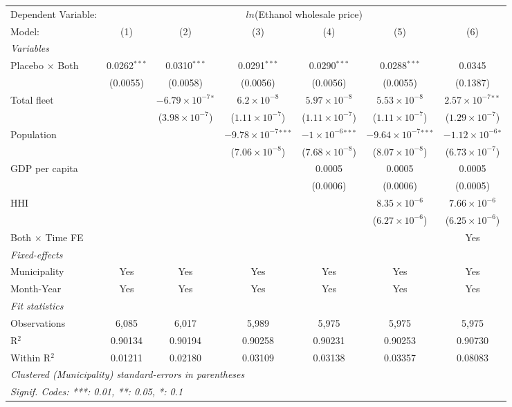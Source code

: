 \documentclass[
]{article}
\begin{document}
\begin{tabular}{lcccccc}
\tabularnewline\midrule\midrule
Dependent Variable:&\multicolumn{6}{c}{$ln$(Ethanol wholesale price)}\\
Model:&(1) & (2) & (3) & (4) & (5) & (6)\\
\midrule \emph{Variables}&   &   &   &   &   &  \\
Placebo $\times $ Both & 0.0262$^{***}$ & 0.0310$^{***}$ & 0.0291$^{***}$ & 0.0290$^{***}$ & 0.0288$^{***}$ & 0.0345\\
  &(0.0055) & (0.0058) & (0.0056) & (0.0056) & (0.0055) & (0.1387)\\
Total fleet &    & $-6.79\times 10^{-7}$$^{*}$ & $6.2\times 10^{-8}$ & $5.97\times 10^{-8}$ & $5.53\times 10^{-8}$ & $2.57\times 10^{-7}$$^{**}$\\
  &   & ($3.98\times 10^{-7}$) & ($1.11\times 10^{-7}$) & ($1.11\times 10^{-7}$) & ($1.11\times 10^{-7}$) & ($1.29\times 10^{-7}$)\\
Population &    &    & $-9.78\times 10^{-7}$$^{***}$ & $-1\times 10^{-6}$$^{***}$ & $-9.64\times 10^{-7}$$^{***}$ & $-1.12\times 10^{-6}$$^{*}$\\
  &   &    & ($7.06\times 10^{-8}$) & ($7.68\times 10^{-8}$) & ($8.07\times 10^{-8}$) & ($6.73\times 10^{-7}$)\\
GDP per capita &    &    &    & 0.0005 & 0.0005 & 0.0005\\
  &   &    &    & (0.0006) & (0.0006) & (0.0005)\\
HHI &    &    &    &    & $8.35\times 10^{-6}$ & $7.66\times 10^{-6}$\\
  &   &    &    &    & ($6.27\times 10^{-6}$) & ($6.25\times 10^{-6}$)\\
Both $\times$ Time FE &  &  &  &  &  & Yes\\
\midrule \emph{Fixed-effects}&   &   &   &   &   &  \\
Municipality & Yes & Yes & Yes & Yes & Yes & Yes\\
Month-Year & Yes & Yes & Yes & Yes & Yes & Yes\\
\midrule \emph{Fit statistics}&  & & & & & \\
Observations & 6,085&6,017&5,989&5,975&5,975&5,975\\
R$^2$ & 0.90134&0.90194&0.90258&0.90231&0.90253&0.90730\\
Within R$^2$ & 0.01211&0.02180&0.03109&0.03138&0.03357&0.08083\\
\midrule\midrule\multicolumn{7}{l}{\emph{Clustered (Municipality) standard-errors in parentheses}}\\
\multicolumn{7}{l}{\emph{Signif. Codes: ***: 0.01, **: 0.05, *: 0.1}}\\
\end{tabular}
\end{document}
